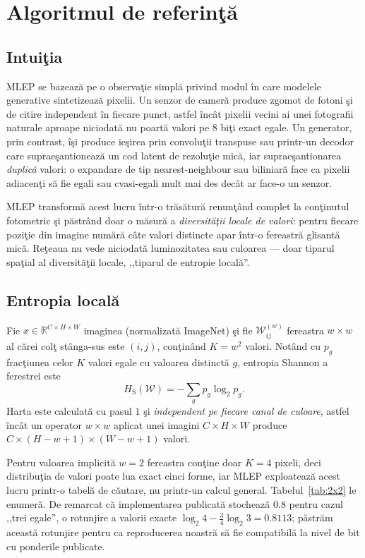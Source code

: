 \section{Algoritmul de referinţă}
\label{sec:algorithm}

\subsection{Intuiţia}

MLEP se bazează pe o observaţie simplă privind modul în care modelele generative
sintetizează pixelii. Un senzor de cameră produce zgomot de fotoni şi de citire
independent în fiecare punct, astfel încât pixelii vecini ai unei fotografii
naturale aproape niciodată nu poartă valori pe 8 biţi exact egale. Un generator,
prin contrast, îşi produce ieşirea prin convoluţii transpuse sau printr-un
decodor care supraeşantionează un cod latent de rezoluţie mică, iar
supraeşantionarea \emph{duplică} valori: o expandare de tip nearest-neighbour
sau biliniară face ca pixelii adiacenţi să fie egali sau cvasi-egali mult mai
des decât ar face-o un senzor.

MLEP transformă acest lucru într-o trăsătură renunţând complet la conţinutul
fotometric şi păstrând doar o măsură a \emph{diversităţii locale de valori}:
pentru fiecare poziţie din imagine numără câte valori distincte apar într-o
fereastră glisantă mică. Reţeaua nu vede niciodată luminozitatea sau culoarea
--- doar tiparul spaţial al diversităţii locale, ,,tiparul de entropie locală''.

\subsection{Entropia locală}

Fie $x \in \mathbb{R}^{C \times H \times W}$ imaginea (normalizată ImageNet) şi
fie $\mathcal{W}_{ij}^{(w)}$ fereastra $w \times w$ al cărei colţ stânga-sus este
$(i,j)$, conţinând $K = w^2$ valori. Notând cu $p_g$ fracţiunea celor $K$ valori
egale cu valoarea distinctă $g$, entropia Shannon a ferestrei este
\begin{equation}
  H_{\text{S}}(\mathcal{W}) = -\sum_{g} p_g \log_2 p_g .
  \label{eq:shannon}
\end{equation}
Harta este calculată cu pasul $1$ şi \emph{independent pe fiecare canal de
culoare}, astfel încât un operator $w\times w$ aplicat unei imagini
$C\times H\times W$ produce $C \times (H-w+1) \times (W-w+1)$ valori.

Pentru valoarea implicită $w=2$ fereastra conţine doar $K=4$ pixeli, deci
distribuţia de valori poate lua exact cinci forme, iar MLEP exploatează acest
lucru printr-o tabelă de căutare, nu printr-un calcul general.
Tabelul~\ref{tab:2x2} le enumeră. De remarcat că implementarea publicată
stochează $0.8$ pentru cazul ,,trei egale'', o rotunjire a valorii exacte
$\log_2 4 - \tfrac{3}{4}\log_2 3 = 0.8113$; păstrăm această rotunjire pentru ca
reproducerea noastră să fie compatibilă la nivel de bit cu ponderile publicate.

